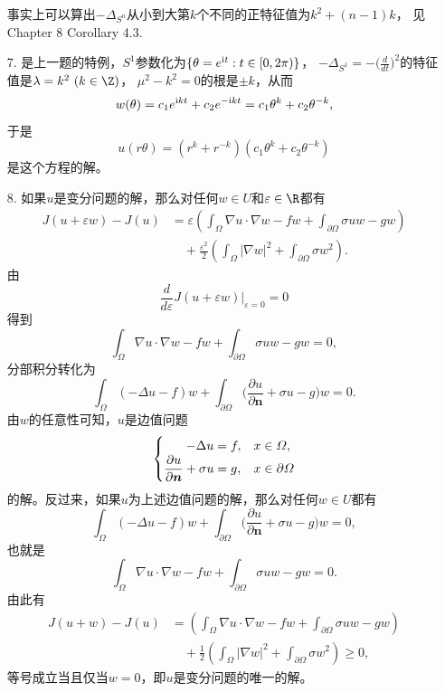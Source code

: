\begin{itemize}
    事实上可以算出$-\Delta_{S^n}$从小到大第$k$个不同的正特征值为$k^2+(n-1)k$，
    见\cite{Ta II} Chapter 8 Corollary 4.3.

    \item[7.] 是上一题的特例，$S^1$参数化为$\{\theta=e^{{\rm i}t}:t\in[0,2\pi)\}$，
    $-\Delta_{S^1}=-\big(\frac{d}{dt}\big)^2$的特征值是$\lambda=k^2\ (k\in\Z)$，
    $\mu^2-k^2=0$的根是$\pm k$，从而
    $$w(\theta)=c_1e^{{\rm i}kt}+c_2e^{-{\rm i}kt}=c_1\theta^k+c_2\theta^{-k},$$
    于是
    $$u(r\theta)=(r^k+r^{-k})(c_1\theta^k+c_2\theta^{-k})$$
    是这个方程的解。

    \item[8.] 如果$u$是变分问题的解，那么对任何$w \in U$和$\varepsilon \in \R$都有
    \begin{align*}
        J(u+\varepsilon w)-J(u)
        &=\varepsilon\left(\int_\varOmega\nabla u\cdot\nabla w-fw
        +\int_{\partial\varOmega}\sigma uw-gw\right)\\
        &\quad+\frac{\varepsilon^2}{2}\left(\int_\varOmega|\nabla w|^2
        +\int_{\partial\varOmega}\sigma w^2\right).
    \end{align*}
    由\[\frac{d}{d\varepsilon}J(u+\varepsilon w)|_{\varepsilon=0}=0\]
    得到\[\int_\varOmega\nabla u\cdot\nabla w-fw+\int_{\partial\varOmega}\sigma uw-gw=0,\]
    分部积分转化为\[\int_\varOmega(-\Delta u-f)w
    +\int_{\partial\varOmega}\bigg(\frac{\partial u}{\partial\boldsymbol{n}}+\sigma u-g\bigg)w=0.\]
    由$w$的任意性可知，$u$是边值问题
    \[\begin{cases}
        \hspace{1.75em}-\Delta u=f,&x\in\varOmega,\\
        \dfrac{\partial u}{\partial\boldsymbol{n}}+\sigma u=g,&x\in\partial\varOmega
    \end{cases}\]
    的解。反过来，如果$u$为上述边值问题的解，那么对任何$w \in U$都有
    \[\int_\varOmega(-\Delta u-f)w
    +\int_{\partial\varOmega}\bigg(\frac{\partial u}{\partial\boldsymbol{n}}+\sigma u-g\bigg)w=0,\]
    也就是\[\int_\varOmega\nabla u\cdot\nabla w-fw+\int_{\partial\varOmega}\sigma uw-gw=0.\]
    由此有
    \begin{align*}
        J(u+w)-J(u)&=\left(\int_\varOmega\nabla u\cdot\nabla w-fw
        +\int_{\partial\varOmega}\sigma uw-gw\right)\\
        &\quad+\frac{1}{2}\left(\int_\varOmega|\nabla w|^2
        +\int_{\partial\varOmega}\sigma w^2\right)\geqslant0,
    \end{align*}
    等号成立当且仅当$w=0$，即$u$是变分问题的唯一的解。


\end{itemize}
